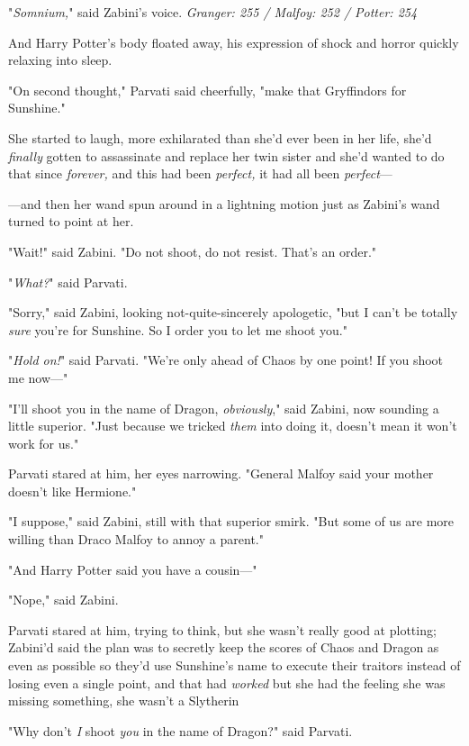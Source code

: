 "\emph{Somnium,}" said Zabini's voice.
\sbreak
\emph{Granger: 255 / Malfoy: 252 / Potter: 254}

And Harry Potter's body floated away, his expression of shock and horror
quickly relaxing into sleep.

"On second thought," Parvati said cheerfully, "make that Gryffindors for
Sunshine."

She started to laugh, more exhilarated than she'd ever been in her life, she'd
\emph{finally} gotten to assassinate and replace her twin sister and she'd
wanted to do that since \emph{forever,} and this had been \emph{perfect,} it
had all been \emph{perfect}---

---and then her wand spun around in a lightning motion just as Zabini's wand
turned to point at her.

"Wait!" said Zabini. "Do not shoot, do not resist. That's an order."

"\emph{What?}" said Parvati.

"Sorry," said Zabini, looking not-quite-sincerely apologetic, "but I can't be
totally \emph{sure} you're for Sunshine. So I order you to let me shoot you."

"\emph{Hold on!}" said Parvati. "We're only ahead of Chaos by one point! If you
shoot me now\mbox{---}"

"I'll shoot you in the name of Dragon, \emph{obviously}," said Zabini, now
sounding a little superior. "Just because we tricked \emph{them} into doing it,
doesn't mean it won't work for us."

Parvati stared at him, her eyes narrowing. "General Malfoy said your mother
doesn't like Hermione."

"I suppose," said Zabini, still with that superior smirk. "But some of us are
more willing than Draco Malfoy to annoy a parent."

"And Harry Potter said you have a cousin\mbox{---}"

"Nope," said Zabini.

Parvati stared at him, trying to think, but she wasn't really good at plotting;
Zabini'd said the plan was to secretly keep the scores of Chaos and Dragon as
even as possible so they'd use Sunshine's name to execute their traitors
instead of losing even a single point, and that had \emph{worked}{\el}
but{\el} she had the feeling she was missing something, she wasn't a
Slytherin{\el}

"Why don't \emph{I} shoot \emph{you} in the name of Dragon?" said Parvati.

